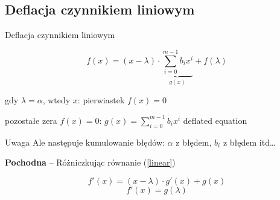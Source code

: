\subsection{Deflacja czynnikiem liniowym}

\begin{frame}{Deflacja czynnikiem liniowym}
  \begin{block}{}
    \begin{equation} f(x) = (x - \lambda) \cdot \underbrace{\sum_{i=0}^{m-1} b_i x^i}_{g(x)} + f(\lambda) \label{linear} \end{equation}
  \end{block}
  gdy $ \lambda = \alpha $, wtedy $x$: pierwiastek $ f(x) = 0 $

  \vspace{5px}

  pozostałe zera $f(x) = 0$: $ g(x) = \sum_{i=0}^{m-1} b_i x^i $ \qquad deflated equation

  \vspace{5px}

  \begin{alertblock}{Uwaga}
    Ale następuje kumulowanie błędów: $\alpha$ z błędem, $b_i$ z błędem itd\dots
  \end{alertblock}
\end{frame}

\begin{frame}
  \textbf{Pochodna} -- Różniczkując równanie (\ref{linear})

  $$ f'(x) = (x - \lambda) \cdot g'(x) + g(x) $$
  $$ f'(x) = g(\lambda) $$
\end{frame}
